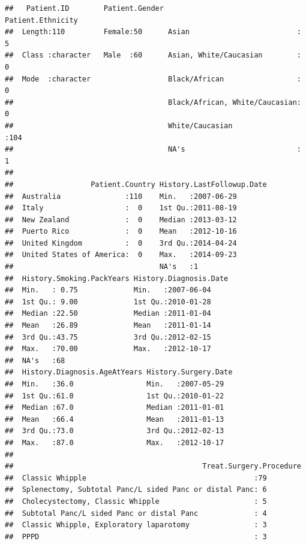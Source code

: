 \documentclass{article}
\begin{document}
\begin{knitrout}
\begin{kframe}
\begin{alltt}
\end{alltt}
\begin{verbatim}
##   Patient.ID        Patient.Gender                      Patient.Ethnicity
##  Length:110         Female:50      Asian                         :  5    
##  Class :character   Male  :60      Asian, White/Caucasian        :  0    
##  Mode  :character                  Black/African                 :  0    
##                                    Black/African, White/Caucasian:  0    
##                                    White/Caucasian               :104    
##                                    NA's                          :  1    
##                                                                          
##                  Patient.Country History.LastFollowup.Date
##  Australia               :110    Min.   :2007-06-29       
##  Italy                   :  0    1st Qu.:2011-08-19       
##  New Zealand             :  0    Median :2013-03-12       
##  Puerto Rico             :  0    Mean   :2012-10-16       
##  United Kingdom          :  0    3rd Qu.:2014-04-24       
##  United States of America:  0    Max.   :2014-09-23       
##                                  NA's   :1                
##  History.Smoking.PackYears History.Diagnosis.Date
##  Min.   : 0.75             Min.   :2007-06-04    
##  1st Qu.: 9.00             1st Qu.:2010-01-28    
##  Median :22.50             Median :2011-01-04    
##  Mean   :26.89             Mean   :2011-01-14    
##  3rd Qu.:43.75             3rd Qu.:2012-02-15    
##  Max.   :70.00             Max.   :2012-10-17    
##  NA's   :68                                      
##  History.Diagnosis.AgeAtYears History.Surgery.Date
##  Min.   :36.0                 Min.   :2007-05-29  
##  1st Qu.:61.0                 1st Qu.:2010-01-22  
##  Median :67.0                 Median :2011-01-01  
##  Mean   :66.4                 Mean   :2011-01-13  
##  3rd Qu.:73.0                 3rd Qu.:2012-02-13  
##  Max.   :87.0                 Max.   :2012-10-17  
##                                                   
##                                            Treat.Surgery.Procedure
##  Classic Whipple                                       :79        
##  Splenectomy, Subtotal Panc/L sided Panc or distal Panc: 6        
##  Cholecystectomy, Classic Whipple                      : 5        
##  Subtotal Panc/L sided Panc or distal Panc             : 4        
##  Classic Whipple, Exploratory laparotomy               : 3        
##  PPPD                                                  : 3        

\end{verbatim}
\end{kframe}
\end{knitrout}
\end{document}
